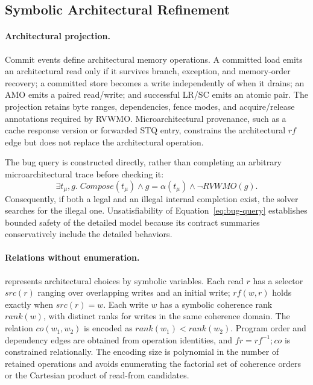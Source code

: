 \subsection{Symbolic Architectural Refinement}
\label{sec:symbolic}

\paragraph{Architectural projection.}
Commit events define architectural memory operations.  A committed load emits
an architectural read only if it survives branch, exception, and memory-order
recovery; a committed store becomes a write independently of when it drains;
an AMO emits a paired read/write; and successful LR/SC emits an atomic pair.
The projection retains byte ranges, dependencies, fence modes, and
acquire/release annotations required by RVWMO.  Microarchitectural provenance,
such as a cache response version or forwarded STQ entry, constrains the
architectural $rf$ edge but does not replace the architectural operation.

The bug query is constructed directly, rather than completing an arbitrary
microarchitectural trace before checking it:
\begin{equation}
 \exists t_\mu,g.\;
   Compose(t_\mu) \land g=\alpha(t_\mu)
   \land \neg RVWMO(g).
 \label{eq:bug-query}
\end{equation}
Consequently, if both a legal and an illegal internal completion exist, the
solver searches for the illegal one.  Unsatisfiability of
Equation~\ref{eq:bug-query} establishes bounded safety of the detailed model
because its contract summaries conservatively include the detailed behaviors.

\paragraph{Relations without enumeration.}
\sys{} represents architectural choices by symbolic variables.  Each read
$r$ has a selector $src(r)$ ranging over overlapping writes and an initial
write; $rf(w,r)$ holds exactly when $src(r)=w$.  Each write $w$ has a symbolic
coherence rank $rank(w)$, with distinct ranks for writes in the same coherence
domain.  The relation $co(w_1,w_2)$ is encoded as
$rank(w_1)<rank(w_2)$.  Program order and dependency edges are obtained from
operation identities, and $fr=rf^{-1};co$ is constrained relationally.  The
encoding size is polynomial in the number of retained operations and avoids
enumerating the factorial set of coherence orders or the Cartesian product of
read-from candidates.

